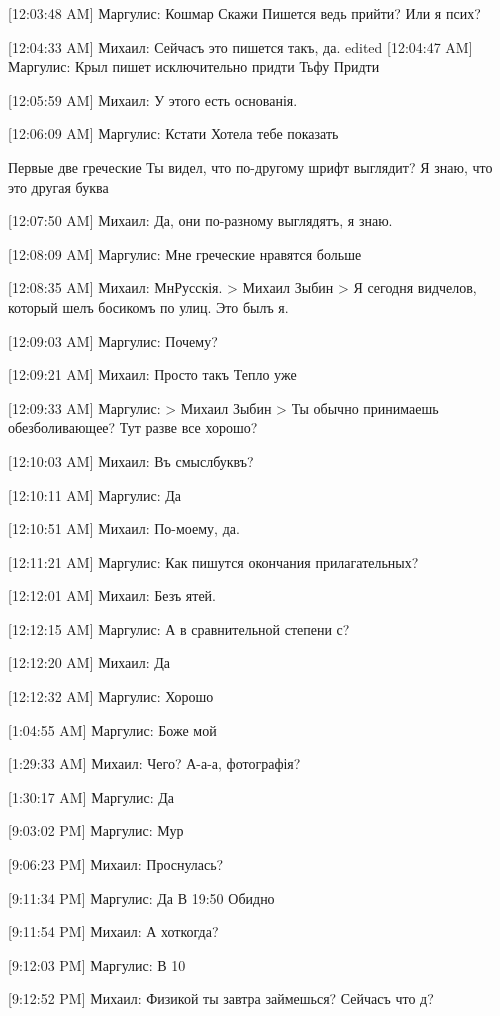 \documentclass{article}
\newcommand{\yat}{{\fontencoding{X2}\selectfont\cyryat}} %
\begin{document}
{[12:03:48 AM] Маргулис:
Кошмар
 Скажи
 Пишется ведь прийти?
 Или я псих?

[12:04:33 AM] Михаил:
Сейчасъ это пишется такъ, да.
edited 
[12:04:47 AM] Маргулис:
Крыл пишет исключительно придти
 Тьфу
 Придти

[12:05:59 AM] Михаил:
У этого есть основанія.

[12:06:09 AM] Маргулис:
Кстати
 Хотела тебе показать

 Первые две греческие
 Ты видел, что по-другому шрифт выглядит?
 Я знаю, что это другая буква

[12:07:50 AM] Михаил:
Да, они по-разному выглядятъ, я знаю.

[12:08:09 AM] Маргулис:
Мне греческие нравятся больше

[12:08:35 AM] Михаил:
Мн\yat Русскія.
> Михаил Зыбин
> Я сегодня вид челов, который шелъ босикомъ по улиц\yat.
Это былъ я.

[12:09:03 AM] Маргулис:
Почему?

[12:09:21 AM] Михаил:
Просто такъ
 Тепло уже

[12:09:33 AM] Маргулис:
> Михаил Зыбин
> Ты обычно принимаешь обезболивающее?
Тут разве все хорошо?

[12:10:03 AM] Михаил:
Въ смысл\yat буквъ?

[12:10:11 AM] Маргулис:
Да

[12:10:51 AM] Михаил:
По-моему, да.

[12:11:21 AM] Маргулис:
Как пишутся окончания прилагательных?

[12:12:01 AM] Михаил:
Безъ ятей.

[12:12:15 AM] Маргулис:
А в сравнительной степени с?

[12:12:20 AM] Михаил:
Да

[12:12:32 AM] Маргулис:
Хорошо

[1:04:55 AM] Маргулис:
Боже мой

[1:29:33 AM] Михаил:
Чего?
 А-а-а, фотографія?

[1:30:17 AM] Маргулис:
Да

[9:03:02 PM] Маргулис:
Мур

[9:06:23 PM] Михаил:
Проснулась?

[9:11:34 PM] Маргулис:
Да
 В 19:50
 Обидно

[9:11:54 PM] Михаил:
А хот когда?

[9:12:03 PM] Маргулис:
В 10

[9:12:52 PM] Михаил:
Физикой ты завтра займешься? Сейчасъ что д?

}
\end{document}
